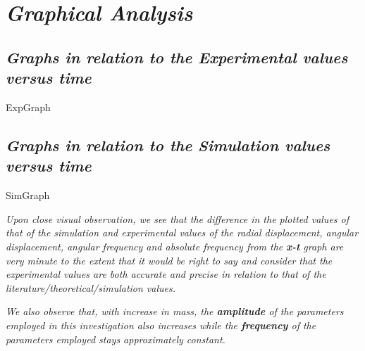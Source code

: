 \section{\textit{Graphical Analysis}}
            
    \subsection{\textit{Graphs in relation to the Experimental values versus time}}
            
        {ExpGraph}
            
    \subsection{\textit{Graphs in relation to the Simulation values versus time}}
            
        {SimGraph}
            
            
    \textit{Upon close visual observation, we see that the difference in the plotted values of that of the simulation and experimental values of the radial displacement, angular displacement, angular frequency and absolute frequency from the \textbf{x-t} graph are very minute to the extent that it would be right to say and consider that the experimental values are both accurate and precise in relation to that of the literature/theoretical/simulation values.}
        
    \textit{We also observe that, with increase in mass, the \textbf{amplitude} of the parameters employed in this investigation also increases while the \textbf{frequency} of the parameters employed stays approximately constant.}
        
    
    

